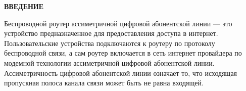 \begin{center}
\textbf{ВВЕДЕНИЕ}
\end{center}

Беспроводной роутер ассиметричной цифровой абонентской линии — это
устройство предназначенное для предоставления доступа в интернет.
Пользовательские устройства подключаются к роутеру по протоколу
беспроводной связи, а сам роутер включается в сеть интернет провайдера
по модемной технологии ассиметричной цифровой абонентской линии.
Ассиметричность цифровой абонентской линии означает то, что исходящая
пропускная полоса канала связи может быть не равна входящей.

\newpage